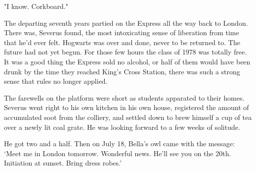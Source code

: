 "I know. Corkboard."

The departing seventh years partied on the Express all the way back to London. There was, Severus found, the most intoxicating sense of liberation from time that he'd ever felt. Hogwarts was over and done, never to be returned to. The future had not yet begun. For those few hours the class of 1978 was totally free. It was a good thing the Express sold no alcohol, or half of them would have been drunk by the time they reached King's Cross Station, there was such a strong sense that rules no longer applied.

The farewells on the platform were short as students apparated to their homes. Severus went right to his own kitchen in his own house, registered the amount of accumulated soot from the colliery, and settled down to brew himself a cup of tea over a newly lit coal grate. He was looking forward to a few weeks of solitude.

He got two and a half. Then on July 18, Bella's owl came with the message: `Meet me in London tomorrow. Wonderful news. He'll see you on the 20th. Initiation at sunset. Bring dress robes.'


